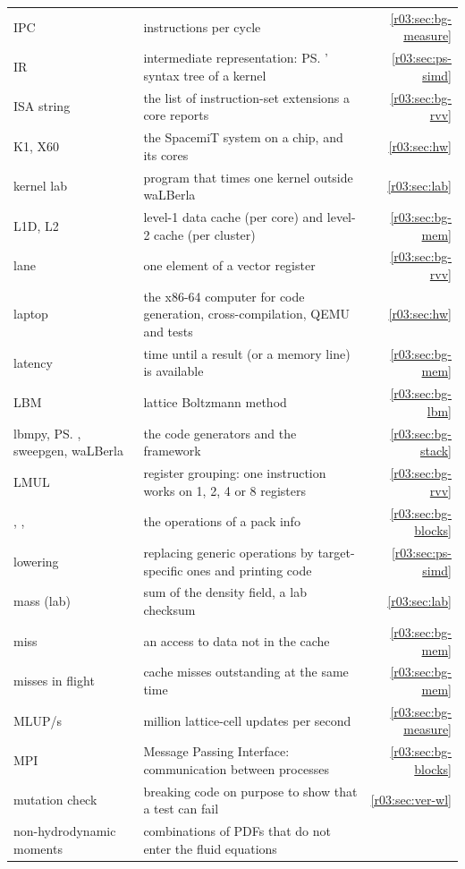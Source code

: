\begin{xltabular}{\linewidth}{@{}>{\raggedright\arraybackslash}p{3.6cm}>{\raggedright\arraybackslash}Xr@{}}
  IPC & instructions per cycle & \ref{r03:sec:bg-measure}\\
  IR & intermediate representation: \ps{}' syntax tree of a kernel & \ref{r03:sec:ps-simd}\\
  ISA string & the list of instruction-set extensions a core reports & \ref{r03:sec:bg-rvv}\\
  K1, X60 & the SpacemiT system on a chip, and its cores & \ref{r03:sec:hw}\\
  kernel lab & program that times one kernel outside waLBerla & \ref{r03:sec:lab}\\
  L1D, L2 & level-1 data cache (per core) and level-2 cache (per cluster) & \ref{r03:sec:bg-mem}\\
  lane & one element of a vector register & \ref{r03:sec:bg-rvv}\\
  laptop & the x86-64 computer for code generation, cross-compilation, QEMU and tests &
    \ref{r03:sec:hw}\\
  latency & time until a result (or a memory line) is available & \ref{r03:sec:bg-mem}\\
  LBM & lattice Boltzmann method & \ref{r03:sec:bg-lbm}\\
  lbmpy, \ps{}, sweepgen, waLBerla & the code generators and the framework & \ref{r03:sec:bg-stack}\\
  LMUL & register grouping: one instruction works on 1, 2, 4 or 8 registers & \ref{r03:sec:bg-rvv}\\
  , ,  & the operations of a pack info &
    \ref{r03:sec:bg-blocks}\\
  lowering & replacing generic operations by target-specific ones and printing code &
    \ref{r03:sec:ps-simd}\\
  mass (lab) & sum of the density field, a lab checksum & \ref{r03:sec:lab}\\
  miss & an access to data not in the cache & \ref{r03:sec:bg-mem}\\
  misses in flight & cache misses outstanding at the same time & \ref{r03:sec:bg-mem}\\
  MLUP/s & million lattice-cell updates per second & \ref{r03:sec:bg-measure}\\
  MPI & Message Passing Interface: communication between processes & \ref{r03:sec:bg-blocks}\\
  mutation check & breaking code on purpose to show that a test can fail & \ref{r03:sec:ver-wl}\\
  non-hydrodynamic moments & combinations of PDFs that do not enter the fluid equations &

\end{xltabular}
